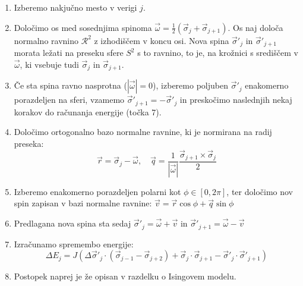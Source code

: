 \documentclass[a4paper]{article}
\newcommand{\half}{\frac{1}{2}}
\newcommand{\s}{\sigma}
\newcommand{\vs}{\vec{\s}}
\newcommand{\vr}{\vec{r}}
\newcommand{\vq}{\vec{q}}
\newcommand{\vv}{\vec{v}}
\newcommand{\vo}{\vec{\omega}}
\newcommand{\D}{\Delta}
\begin{document}
    \begin{enumerate}
        \item Izberemo nakjučno mesto v verigi $j$.
        \item Določimo os med sosednjima spinoma $\vo = \half (\vs_j + \vs_{j+1})$.
        Os naj določa normalno ravnino $\mathcal{R}^2$ z izhodiščem v koncu osi.
        Nova spina $\vs'_{j}$ in $\vs'_{j+1}$ morata ležati na preseku sfere $S^2$ s to ravnino, to je, na krožnici
        s središčem v $\vo$, ki vsebuje tudi $\vs_j$ in $\vs_{j+1}$.
        \item Če sta spina ravno nasprotna ($|\vo| = 0$), izberemo poljuben $\vs'_j$ enakomerno porazdeljen na sferi,
        vzamemo $\vs'_{j+1} = -\vs'_j$ in preskočimo naslednjih nekaj korakov do računanja energije (točka 7).
        \item Določimo ortogonalno bazo normalne ravnine, ki je normirana na radij preseka:
        \begin{equation}\label{eq12}
            \vr = \vs_{j} - \vo, \quad \vq = \frac{1}{|\vo|} \frac{\vs_{j+1} \times \vs_{j}}{2}
        \end{equation}
        \item Izberemo enakomerno porazdeljen polarni kot $\phi \in [0, 2\pi]$, ter določimo nov spin zapisan v bazi
        normalne ravnine: $\vv = \vr \cos{\phi} + \vq \sin{\phi}$
        \item Predlagana nova spina sta sedaj $\vs'_{j} = \vo + \vv$ in $\vs'_{j+1} = \vo - \vv$
        \item Izračunamo spremembo energije:
        \begin{equation}\label{eq13}
            \D E_j = J(\D \vs'_{j} \cdot (\vs_{j-1} - \vs_{j+2}) + \vs_j \cdot \vs_{j+1} - \vs'_j \cdot \vs'_{j+1})
        \end{equation}
        \item Postopek naprej je že opisan v razdelku o Isingovem modelu.
    \end{enumerate}

    \iffalse
    \begin{figure}
        \centering
        \texttt{[image: slika16.pdf]}
        \caption{Odvisnost toka $J$ med termostatom in verigo v odvisnosti od časa vzorčenja $\tau$.
        Računano je na anharmonski ($\lambda = 1$) verigi dolžine $N = 10$ in povprečeno po $1000$ vzorcih.
        $J_1$ se nanaša na tok na levi, $J_2$ pa na desni strani verige.}
        \label{slika6}
    \end{figure}
    \fi
\end{document}
